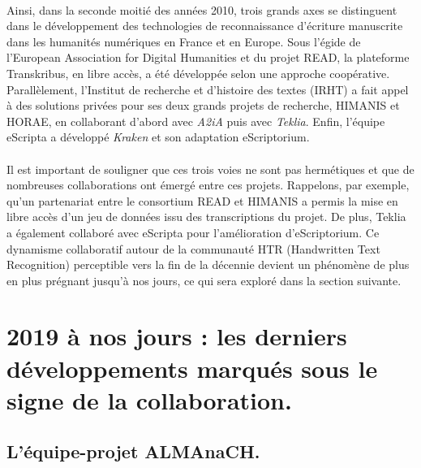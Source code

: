 \documentclass[a4paper,12pt,twoside]{book}
\begin{document}
\paragraph{}
Ainsi, dans la seconde moitié des années 2010, trois grands axes se distinguent dans le développement des technologies de reconnaissance d’écriture manuscrite dans les humanités numériques en France et en Europe. Sous l’égide de l’European Association for Digital Humanities et du projet READ, la plateforme Transkribus, en libre accès, a été développée selon une approche coopérative. Parallèlement, l’Institut de recherche et d'histoire des textes (IRHT) a fait appel à des solutions privées pour ses deux grands projets de recherche, HIMANIS et HORAE, en collaborant d’abord avec \textit{A2iA} puis avec \textit{Teklia}. Enfin, l’équipe eScripta a développé \textit{Kraken} et son adaptation eScriptorium.

\paragraph{}
Il est important de souligner que ces trois voies ne sont pas hermétiques et que de nombreuses collaborations ont émergé entre ces projets. Rappelons, par exemple, qu'un partenariat entre le consortium READ et HIMANIS a permis la mise en libre accès d’un jeu de données issu des transcriptions du projet. De plus, Teklia a également collaboré avec eScripta pour l’amélioration d’eScriptorium. Ce dynamisme collaboratif autour de la communauté HTR (Handwritten Text Recognition) perceptible vers la fin de la décennie devient un phénomène de plus en plus prégnant jusqu'à nos jours, ce qui sera exploré dans la section suivante.


\section{2019 à nos jours : les derniers développements marqués sous le signe de la collaboration.}
	\subsection{L'équipe-projet ALMAnaCH.}
\end{document}
